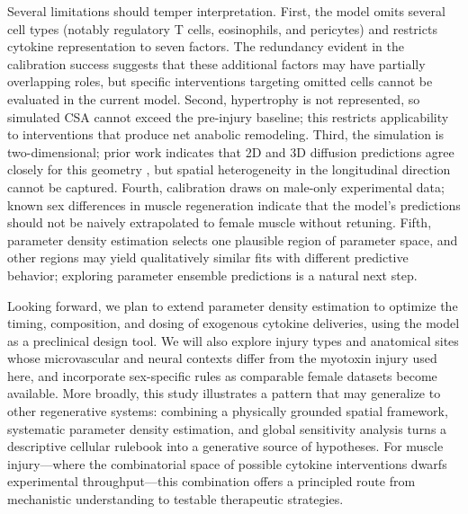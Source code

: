 \documentclass[10pt,letterpaper]{article}
\begin{document}
Several limitations should temper interpretation. First, the model omits several cell types (notably regulatory T cells, eosinophils, and pericytes) and restricts cytokine representation to seven factors. The redundancy evident in the calibration success suggests that these additional factors may have partially overlapping roles, but specific interventions targeting omitted cells cannot be evaluated in the current model. Second, hypertrophy is not represented, so simulated CSA cannot exceed the pre-injury baseline; this restricts applicability to interventions that produce net anabolic remodeling. Third, the simulation is two-dimensional; prior work indicates that 2D and 3D diffusion predictions agree closely for this geometry \cite{hillen2009user}, but spatial heterogeneity in the longitudinal direction cannot be captured. Fourth, calibration draws on male-only experimental data; known sex differences in muscle regeneration \cite{kararigas2022sex} indicate that the model's predictions should not be naively extrapolated to female muscle without retuning. Fifth, parameter density estimation selects one plausible region of parameter space, and other regions may yield qualitatively similar fits with different predictive behavior; exploring parameter ensemble predictions is a natural next step.

Looking forward, we plan to extend parameter density estimation to optimize the timing, composition, and dosing of exogenous cytokine deliveries, using the model as a preclinical design tool. We will also explore injury types and anatomical sites whose microvascular and neural contexts differ from the myotoxin injury used here, and incorporate sex-specific rules as comparable female datasets become available. More broadly, this study illustrates a pattern that may generalize to other regenerative systems: combining a physically grounded spatial framework, systematic parameter density estimation, and global sensitivity analysis turns a descriptive cellular rulebook into a generative source of hypotheses. For muscle injury---where the combinatorial space of possible cytokine interventions dwarfs experimental throughput---this combination offers a principled route from mechanistic understanding to testable therapeutic strategies.



\end{document}
